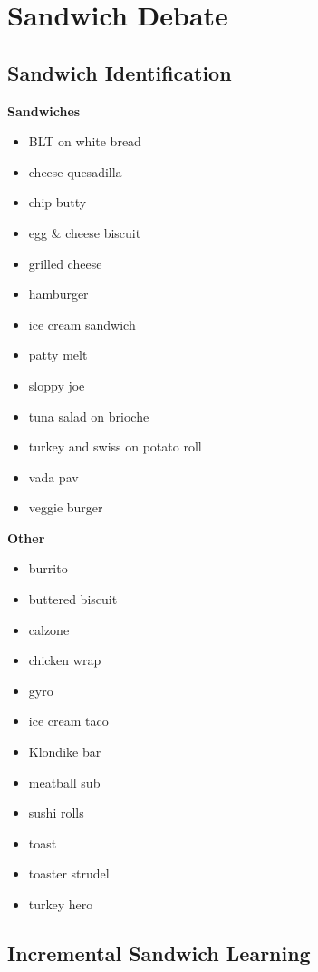 \section{Sandwich Debate}
\subsection{Sandwich Identification}
\begin{minipage}{.5\textwidth}
	\textbf{Sandwiches}
	\begin{itemize}
		\item BLT on white bread
		\item cheese quesadilla
		\item chip butty
		\item egg \& cheese biscuit
		\item grilled cheese
		\item hamburger
		\item ice cream sandwich
		\item patty melt
		\item sloppy joe
		\item tuna salad on brioche
		\item turkey and swiss on potato roll
		\item vada pav
		\item veggie burger
	\end{itemize}
\end{minipage}
\begin{minipage}{.5\textwidth}
	\textbf{Other}
	\begin{itemize}
		\item burrito
		\item buttered biscuit
		\item calzone
		\item chicken wrap
		\item gyro
		\item ice cream taco
		\item Klondike bar
		\item meatball sub
		\item sushi rolls
		\item toast
		\item toaster strudel
		\item turkey hero
	\end{itemize}
\end{minipage}


\subsection{Incremental Sandwich Learning}
